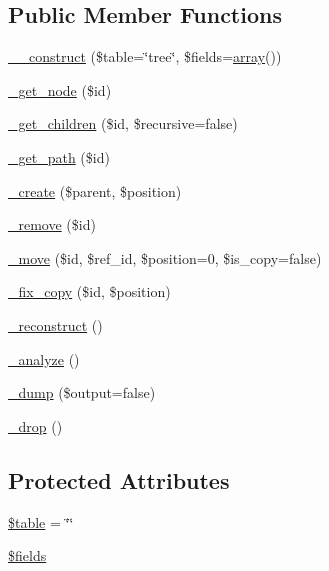\subsection*{Public Member Functions}
\begin{DoxyCompactItemize}
\item 
\hyperlink{class__tree__struct_a3368329f1ecafdb0bdce824dbee11498}{\_\-\_\-construct} (\$table=\char`\"{}tree\char`\"{}, \$fields=\hyperlink{list_8php_aa3205d038c7f8feb5c9f01ac4dfadc88}{array}())
\item 
\hyperlink{class__tree__struct_a90730cdcab513af31c7033d53a7cbe3f}{\_\-get\_\-node} (\$id)
\item 
\hyperlink{class__tree__struct_a7b40c7b6776f12e9c4847a93e5c715c1}{\_\-get\_\-children} (\$id, \$recursive=false)
\item 
\hyperlink{class__tree__struct_a4945f310704298fe7ac7a927b7fb7ce1}{\_\-get\_\-path} (\$id)
\item 
\hyperlink{class__tree__struct_a097c5e483b03258fbe1893f8822e4138}{\_\-create} (\$parent, \$position)
\item 
\hyperlink{class__tree__struct_a0fc184abc11c32c1cf813d707a681396}{\_\-remove} (\$id)
\item 
\hyperlink{class__tree__struct_a47b82b8960edd18df25314f245e0b12c}{\_\-move} (\$id, \$ref\_\-id, \$position=0, \$is\_\-copy=false)
\item 
\hyperlink{class__tree__struct_a7c3a2753320674328d39804e4333a1bf}{\_\-fix\_\-copy} (\$id, \$position)
\item 
\hyperlink{class__tree__struct_aaf77ed918b21b0bce15524444d52524c}{\_\-reconstruct} ()
\item 
\hyperlink{class__tree__struct_a0eef238b7c7f5f0e47973effe8f7bcd7}{\_\-analyze} ()
\item 
\hyperlink{class__tree__struct_a1818640cf9af42e68f1ed55e6c6ef922}{\_\-dump} (\$output=false)
\item 
\hyperlink{class__tree__struct_a6087da3fdf86bec06110235e038d4163}{\_\-drop} ()
\end{DoxyCompactItemize}
\subsection*{Protected Attributes}
\begin{DoxyCompactItemize}
\item 
\hyperlink{class__tree__struct_ae8876a14058f368335baccf35af4a22b}{\$table} = \char`\"{}\char`\"{}
\item 
\hyperlink{class__tree__struct_ab2303c817e3b402b77b7f99627b9c319}{\$fields}
\end{DoxyCompactItemize}


